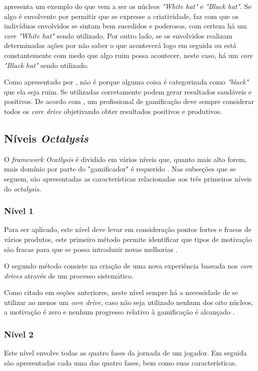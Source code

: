  apresenta um exemplo do que vem a ser os núcleos \textit{"White hat"} e \textit{"Black hat"}. Se algo é envolvente
por permitir que se expresse a criatividade, faz com que os indivíduos envolvidos se sintam bem sucedidos e poderosos, com certeza há um \textit{core} 
\textit{"White hat"} sendo utilizado. Por outro lado, se os envolvidos realizam determinadas ações por não saber o que acontecerá logo em seguida ou está
constantemente com medo que algo ruim possa acontecer, neste caso, há um \textit{core} \textit{"Black hat"} sendo utilizado.

Como apresentado por , não é porque alguma coisa é categorizada como \textit{"black"} que ela seja ruim. Se utilizadas
corretamente podem gerar resultados saudáveis e positivos. De acordo com , um profissional de gamificação deve sempre considerar
todos os \textit{core drive} objetivando obter resultados positivos e produtivos.


\subsection{Níveis \textit{Octalysis}}

O \textit{framework Ocatlysis} é dividido em vários níveis que, quanto mais alto forem, mais domínio por parte do "gamificador" é requerido \cite{chou2017actionable}.
Nas subseções que se seguem, são apresentadas as características relacionadas aos três primeiros níveis do \textit{octalysis}.

\subsubsection{Nível 1}
Para ser aplicado, este nível deve levar em consideração pontos fortes e fracos de vários produtos, este primeiro método permite identificar
que tipos de motivação são fracas para que se possa introduzir novas melhorias \cite{chou2017actionable}.

O segundo método consiste na criação de uma nova experiência baseada nos \textit{core drives} através de um processo sistemático.

Como citado em seções anteriores, neste nível sempre há a necessidade de se utilizar ao menos um \textit{core drive}, caso não seja utilizado nenhum
dos oito núcleos, a motivação é zero e nenhum progresso relativo à gamificação é alcançado \cite{chou2017actionable}.

\subsubsection{Nível 2}
Este nível envolve todas as quatro fases da jornada de um jogador. Em seguida são apresentadas cada uma das quatro fases, bem como suas características.

